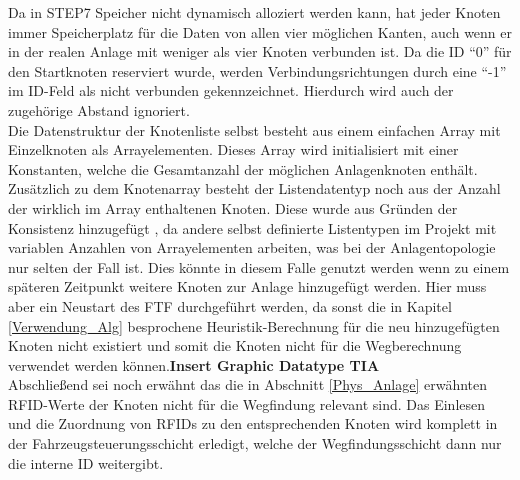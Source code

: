 			Da in \ac{STEP7} Speicher nicht dynamisch alloziert werden kann, hat jeder Knoten immer Speicherplatz für die Daten von allen vier möglichen Kanten, auch wenn er in der realen Anlage mit weniger als vier Knoten verbunden ist. Da die ID "`0"' für den Startknoten reserviert wurde, werden Verbindungsrichtungen durch eine "`-1"' im ID-Feld als nicht verbunden gekennzeichnet. Hierdurch wird auch der zugehörige Abstand ignoriert.
			\\
			Die Datenstruktur der Knotenliste selbst besteht aus einem einfachen Array mit Einzelknoten als Arrayelementen. Dieses Array wird initialisiert mit einer Konstanten, welche die Gesamtanzahl der möglichen Anlagenknoten enthält. Zusätzlich zu dem Knotenarray besteht der Listendatentyp noch aus der Anzahl der wirklich im Array enthaltenen Knoten. Diese wurde aus Gründen der Konsistenz hinzugefügt , da andere selbst definierte Listentypen im Projekt mit variablen Anzahlen von Arrayelementen arbeiten, was bei der Anlagentopologie nur selten der Fall ist. Dies könnte in diesem Falle genutzt werden wenn zu einem späteren Zeitpunkt weitere Knoten zur Anlage hinzugefügt werden. Hier muss aber ein Neustart des \ac{FTF} durchgeführt werden, da sonst die in Kapitel \ref{Verwendung_Alg} besprochene Heuristik-Berechnung für die neu hinzugefügten Knoten nicht existiert und somit die Knoten nicht für die Wegberechnung verwendet werden können.\textbf{Insert Graphic Datatype TIA}
			\\
			Abschließend sei noch erwähnt das die in Abschnitt \ref{Phys_Anlage} erwähnten \ac{RFID}-Werte der Knoten nicht für die Wegfindung relevant sind. Das Einlesen und die Zuordnung von \ac{RFID}s zu den entsprechenden Knoten wird komplett in der Fahrzeugsteuerungsschicht erledigt, welche der Wegfindungsschicht dann nur die  interne ID weitergibt.
			
